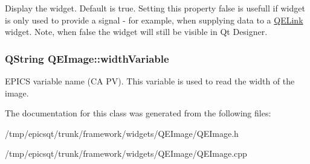 \label{classQEImage_a759388af5e06a2a86e300e1a5b6ce532}
Display the widget. Default is true. Setting this property false is usefull if widget is only used to provide a signal -\/ for example, when supplying data to a \hyperlink{classQELink}{QELink} widget. Note, when false the widget will still be visible in Qt Designer. \hypertarget{classQEImage_aafee99d124174f1efe12b779d1a37d63}{
\subsubsection[{widthVariable}]{\setlength{\rightskip}{0pt plus 5cm}QString QEImage::widthVariable}}
\label{classQEImage_aafee99d124174f1efe12b779d1a37d63}
EPICS variable name (CA PV). This variable is used to read the width of the image. 

The documentation for this class was generated from the following files:\begin{DoxyCompactItemize}
\item 
/tmp/epicsqt/trunk/framework/widgets/QEImage/QEImage.h\item 
/tmp/epicsqt/trunk/framework/widgets/QEImage/QEImage.cpp\end{DoxyCompactItemize}
